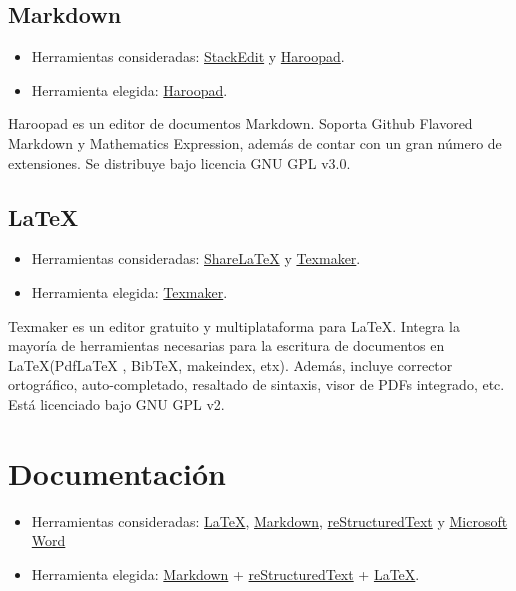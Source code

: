 \subsection{Markdown}\label{markdown}

\begin{itemize}
\tightlist
\item
  Herramientas consideradas: \href{https://stackedit.io/}{StackEdit} y
  \href{http://pad.haroopress.com/}{Haroopad}.
\item
  Herramienta elegida: \href{http://pad.haroopress.com/}{Haroopad}.
\end{itemize}

Haroopad es un editor de documentos Markdown. Soporta Github Flavored
Markdown y Mathematics Expression, además de contar con un gran número
de extensiones. Se distribuye bajo licencia GNU GPL v3.0.

\subsection{LaTeX}\label{latex}

\begin{itemize}
\tightlist
\item
  Herramientas consideradas:
  \href{https://www.sharelatex.com/}{ShareLaTeX} y
  \href{http://www.xm1math.net/texmaker/}{Texmaker}.
\item
  Herramienta elegida:
  \href{http://www.xm1math.net/texmaker/}{Texmaker}.
\end{itemize}

Texmaker es un editor gratuito y multiplataforma para \LaTeX. Integra la
mayoría de herramientas necesarias para la escritura de documentos en
\LaTeX (PdfLaTeX , BibTeX, makeindex, etx). Además, incluye corrector
ortográfico, auto-completado, resaltado de sintaxis, visor de PDFs
integrado, etc. Está licenciado bajo GNU GPL v2.

\section{Documentación}\label{documentacion}

\begin{itemize}
\tightlist
\item
  Herramientas consideradas:
  \href{https://www.latex-project.org/}{LaTeX},
  \href{http://daringfireball.net/projects/markdown/}{Markdown},
  \href{http://docutils.sourceforge.net/docs/ref/rst/restructuredtext.html}{reStructuredText} y  
  \href{https://products.office.com/es-es/word}{Microsoft Word}
\item
  Herramienta elegida:
  \href{http://daringfireball.net/projects/markdown/}{Markdown} +
  \href{http://docutils.sourceforge.net/docs/ref/rst/restructuredtext.html}{reStructuredText} +
  \href{https://www.latex-project.org/}{\LaTeX}.
\end{itemize}

